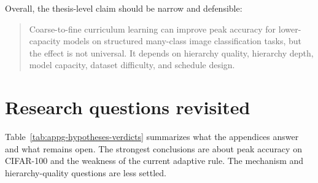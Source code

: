Overall, the thesis-level claim should be narrow and defensible:

\begin{quote}
Coarse-to-fine curriculum learning can improve peak accuracy for lower-capacity
models on structured many-class image classification tasks, but the effect is
not universal. It depends on hierarchy quality, hierarchy depth, model capacity,
dataset difficulty, and schedule design.
\end{quote}

\section{Research questions revisited}

Table~\ref{tab:appg-hypotheses-verdicts} summarizes what the appendices answer
and what remains open. The strongest conclusions are about peak accuracy on
CIFAR-100 and the weakness of the current adaptive rule. The mechanism and
hierarchy-quality questions are less settled.


